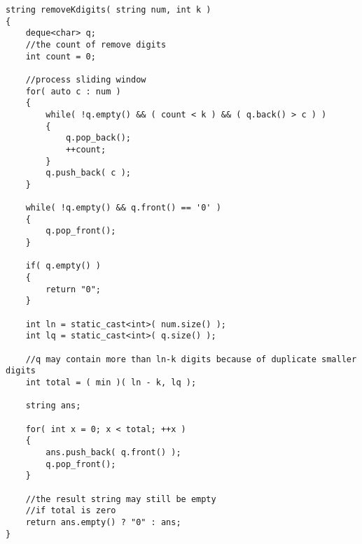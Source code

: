 \setcounter{lstlisting}{0}
\begin{lstlisting}[style=customc, caption={Sliding Window}]
string removeKdigits( string num, int k )
{
    deque<char> q;
    //the count of remove digits
    int count = 0;

    //process sliding window
    for( auto c : num )
    {
        while( !q.empty() && ( count < k ) && ( q.back() > c ) )
        {
            q.pop_back();
            ++count;
        }
        q.push_back( c );
    }

    while( !q.empty() && q.front() == '0' )
    {
        q.pop_front();
    }

    if( q.empty() )
    {
        return "0";
    }

    int ln = static_cast<int>( num.size() );
    int lq = static_cast<int>( q.size() );

    //q may contain more than ln-k digits because of duplicate smaller digits
    int total = ( min )( ln - k, lq );

    string ans;

    for( int x = 0; x < total; ++x )
    {
        ans.push_back( q.front() );
        q.pop_front();
    }

    //the result string may still be empty
    //if total is zero
    return ans.empty() ? "0" : ans;
}
\end{lstlisting}